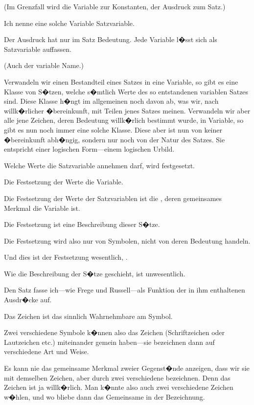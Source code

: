 \begin{propositions}
{(Im Grenzfall wird die Variable zur Konstanten,
der Ausdruck zum Satz.)

Ich nenne eine solche Variable \glqq{}Satzvariable\grqq{}.}


{Der Ausdruck hat nur im Satz Bedeutung.
Jede Variable l�sst sich als Satzvariable auffassen.

(Auch der variable Name.)}


{Verwandeln wir einen Bestandteil eines Satzes
in eine Variable, so gibt es eine Klasse von S�tzen,
welche s�mtlich Werte des so entstandenen variablen
Satzes sind. Diese Klasse h�ngt im allgemeinen
noch davon ab, was wir, nach willk�rlicher
�bereinkunft, mit Teilen jenes Satzes meinen.
Verwandeln wir aber alle jene Zeichen, deren
Bedeutung willk�rlich bestimmt wurde, in Variable,
so gibt es nun noch immer eine solche Klasse.
Diese aber ist nun von keiner �bereinkunft
abh�ngig, sondern nur noch von der Natur des
Satzes. Sie entspricht einer logischen Form---einem
logischen Urbild.}


{Welche Werte die Satzvariable annehmen darf,
wird festgesetzt.

Die Festsetzung der Werte  die Variable.}


{Die Festsetzung der Werte der Satzvariablen
ist die , deren gemeinsames
Merkmal die Variable ist.

Die Festsetzung ist eine Beschreibung dieser
S�tze.

Die Festsetzung wird also nur von Symbolen,
nicht von deren Bedeutung handeln.

Und  dies ist der Festsetzung wesentlich,
.

Wie die Beschreibung der S�tze geschieht, ist
unwesentlich.}


{Den Satz fasse ich---wie Frege und Russell---als
Funktion der in ihm enthaltenen Ausdr�cke auf.}


{Das Zeichen ist das sinnlich Wahrnehmbare am
Symbol.}


{Zwei verschiedene Symbole k�nnen also das
Zeichen (Schriftzeichen oder Lautzeichen etc.)
miteinander gemein haben---sie bezeichnen dann
auf verschiedene Art und Weise.}


{Es kann nie das gemeinsame Merkmal zweier
Gegenst�nde anzeigen, dass wir sie mit demselben
Zeichen, aber durch zwei verschiedene 
bezeichnen. Denn das Zeichen
ist ja willk�rlich. Man k�nnte also auch zwei verschiedene
Zeichen w�hlen, und wo bliebe dann das
Gemeinsame in der Bezeichnung.}



\end{propositions}
